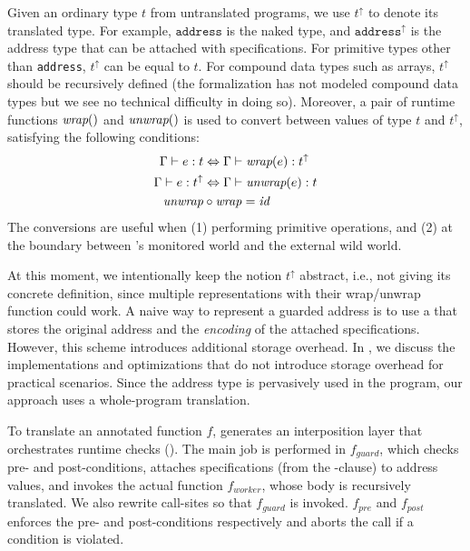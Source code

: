 Given an ordinary type $t$ from untranslated programs, we use $t^\uparrow$
to denote its translated type. 
For example, $\texttt{address}$ is the naked type, and $\texttt{address}^\uparrow$
is the address type that can be attached with specifications. %
For primitive types other than \texttt{address}, $t^\uparrow$ can be equal to $t$.
For compound data types such as arrays, $t^\uparrow$ should be recursively defined 
(the formalization has not modeled compound data types but we see no technical difficulty in doing so).
Moreover, a pair of runtime functions $\textit{wrap}()$
and $\textit{unwrap}()$ is used to convert between values of type $t$ and $t^\uparrow$,
satisfying the following conditions:
\begin{align*}
\Gamma \vdash e : t & \Leftrightarrow  \Gamma \vdash \textit{wrap}(e) : t^\uparrow \\
\Gamma \vdash e : t^\uparrow & \Leftrightarrow  \Gamma \vdash \textit{unwrap}(e) : t \\
\mathit{unwrap} & \circ \mathit{wrap} = \mathit{id} 
\end{align*}
The conversions are useful when (1) performing primitive operations, and (2)
at the boundary between \lang's monitored world and the external wild world.

At this moment, we intentionally keep the notion $t^\uparrow$ abstract, 
i.e., not giving its concrete definition, since multiple representations with their 
wrap/unwrap function could work.
A naive way to represent a guarded address is to use a  that stores
the original address and the \emph{encoding} of the attached specifications.
However, this scheme introduces additional storage overhead.
In , we discuss the implementations and optimizations that do not
introduce storage overhead for practical scenarios.
Since the address type is pervasively used in the program, our approach
uses a whole-program translation.


To translate an annotated function $f$, \lang generates an interposition layer
that orchestrates runtime checks ().
The main job is performed in $f_\textit{guard}$,
which checks pre- and post-conditions, attaches specifications (from the -clause)
to address values, and invokes the actual function $f_\textit{worker}$,
whose body is recursively translated.
We also rewrite call-sites so that $f_\textit{guard}$ is invoked.
$f_{pre}$ and $f_{post}$ enforces the pre- and post-conditions 
respectively and aborts the call if a condition is violated.

